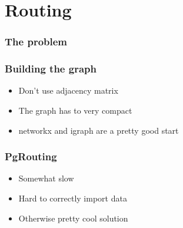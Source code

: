 \documentclass[14pt]{beamer}
\begin{document}
\section{Routing}

\begin{frame}
  \frametitle{The problem}
\end{frame}

\begin{frame}
  \frametitle{Building the graph}
  \begin{itemize}
  \item Don't use adjacency matrix
  \item The graph has to very compact
  \item networkx and igraph are a pretty good start
  \end{itemize}
\end{frame}

\begin{frame}
  \frametitle{PgRouting}
  \begin{itemize}
  \item Somewhat slow
  \item Hard to correctly import data
  \item Otherwise pretty cool solution
  \end{itemize}
\end{frame}



















\end{document}

